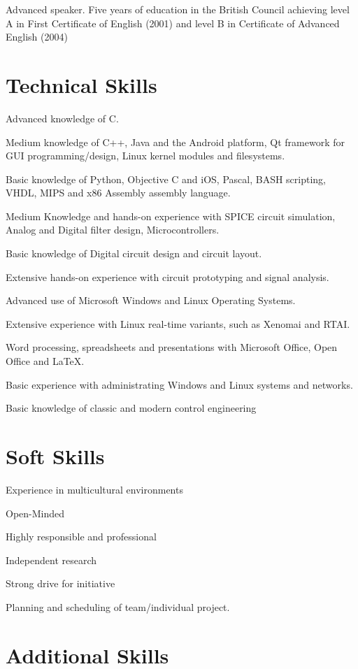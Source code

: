 
{
Advanced speaker. Five years of education in the British Council achieving
level A in First Certificate of English (2001) and level B in Certificate of
Advanced English (2004)
}



\section*{Technical Skills}

{
Advanced knowledge of C.
			
Medium knowledge of C++, Java and the Android platform, Qt framework for GUI
programming/design, Linux kernel modules and filesystems.
			
Basic knowledge of Python, Objective C and iOS, Pascal, BASH scripting, VHDL,
MIPS and x86 Assembly assembly language.
}

{
Medium Knowledge and hands-on experience with SPICE circuit simulation, Analog
and Digital filter design, Microcontrollers.
			 
Basic knowledge of Digital circuit design and circuit layout.

Extensive hands-on experience with circuit prototyping and signal analysis.
}

{
Advanced use of Microsoft Windows and Linux Operating Systems.

Extensive experience with Linux real-time variants, such as Xenomai and RTAI.

Word processing, spreadsheets and presentations with Microsoft Office, Open
Office and \LaTeX.

Basic experience with administrating Windows and Linux systems and networks.

Basic knowledge of classic and modern control engineering
}


\section*{Soft Skills}

{
Experience in multicultural environments

Open-Minded

Highly responsible and professional
}

{
Independent research

Strong drive for initiative

Planning and scheduling of team/individual project.
}

\section*{Additional Skills}



